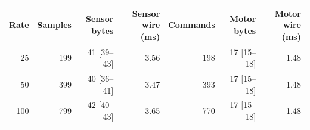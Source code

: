 \begin{tabular}{@{}rrrrrrr@{}}
\toprule
Rate & Samples & Sensor bytes & Sensor wire (ms) & Commands & Motor bytes & Motor wire (ms) \\
\midrule
25 & 199 & 41 [39--43] & 3.56 & 198 & 17 [15--18] & 1.48 \\
50 & 399 & 40 [36--41] & 3.47 & 393 & 17 [15--18] & 1.48 \\
100 & 799 & 42 [40--43] & 3.65 & 770 & 17 [15--18] & 1.48 \\
\bottomrule
\end{tabular}
